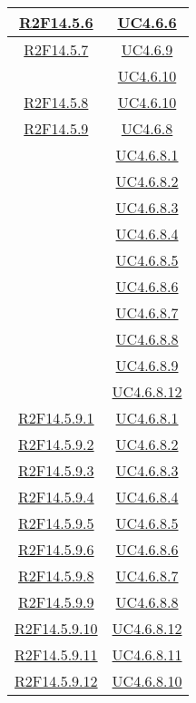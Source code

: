 \begin{longtable}{|c|c|}
\hline
\hyperlink{R2F14.5.6}{R2F14.5.6} & \hyperlink{UC4.6.6}{UC4.6.6}\\
\hline
\hyperlink{R2F14.5.7}{R2F14.5.7} & \hyperlink{UC4.6.9}{UC4.6.9}\\
& \hyperlink{UC4.6.10}{UC4.6.10}\\
\hline
\hyperlink{R2F14.5.8}{R2F14.5.8} & \hyperlink{UC4.6.10}{UC4.6.10}\\
\hline
\hyperlink{R2F14.5.9}{R2F14.5.9} & \hyperlink{UC4.6.8}{UC4.6.8}\\
& \hyperlink{UC4.6.8.1}{UC4.6.8.1}\\
& \hyperlink{UC4.6.8.2}{UC4.6.8.2}\\
& \hyperlink{UC4.6.8.3}{UC4.6.8.3}\\
& \hyperlink{UC4.6.8.4}{UC4.6.8.4}\\
& \hyperlink{UC4.6.8.5}{UC4.6.8.5}\\
& \hyperlink{UC4.6.8.6}{UC4.6.8.6}\\
& \hyperlink{UC4.6.8.7}{UC4.6.8.7}\\
& \hyperlink{UC4.6.8.8}{UC4.6.8.8}\\
& \hyperlink{UC4.6.8.9}{UC4.6.8.9}\\
& \hyperlink{UC4.6.8.12}{UC4.6.8.12}\\
\hline
\hyperlink{R2F14.5.9.1}{R2F14.5.9.1} & \hyperlink{UC4.6.8.1}{UC4.6.8.1}\\
\hline
\hyperlink{R2F14.5.9.2}{R2F14.5.9.2} & \hyperlink{UC4.6.8.2}{UC4.6.8.2}\\
\hline
\hyperlink{R2F14.5.9.3}{R2F14.5.9.3} & \hyperlink{UC4.6.8.3}{UC4.6.8.3}\\
\hline
\hyperlink{R2F14.5.9.4}{R2F14.5.9.4} & \hyperlink{UC4.6.8.4}{UC4.6.8.4}\\
\hline
\hyperlink{R2F14.5.9.5}{R2F14.5.9.5} & \hyperlink{UC4.6.8.5}{UC4.6.8.5}\\
\hline
\hyperlink{R2F14.5.9.6}{R2F14.5.9.6} & \hyperlink{UC4.6.8.6}{UC4.6.8.6}\\
\hline
\hyperlink{R2F14.5.9.8}{R2F14.5.9.8} & \hyperlink{UC4.6.8.7}{UC4.6.8.7}\\
\hline
\hyperlink{R2F14.5.9.9}{R2F14.5.9.9} & \hyperlink{UC4.6.8.8}{UC4.6.8.8}\\
\hline
\hyperlink{R2F14.5.9.10}{R2F14.5.9.10} & \hyperlink{UC4.6.8.12}{UC4.6.8.12}\\
\hline
\hyperlink{R2F14.5.9.11}{R2F14.5.9.11} & \hyperlink{UC4.6.8.11}{UC4.6.8.11}\\
\hline
\hyperlink{R2F14.5.9.12}{R2F14.5.9.12} & \hyperlink{UC4.6.8.10}{UC4.6.8.10}\\

\end{longtable}
